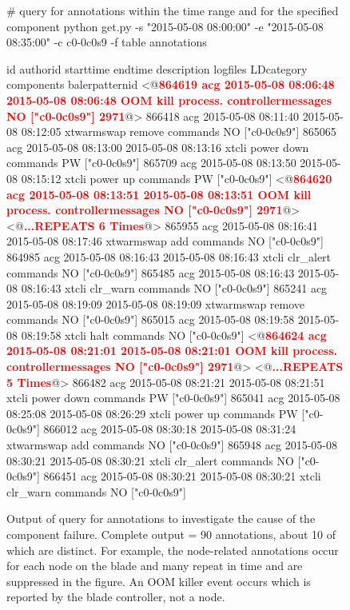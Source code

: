 \begin{figure*}
\begin{annol}
# query for annotations within the time range and for the specified component
python get.py -s "2015-05-08 08:00:00" -e "2015-05-08 08:35:00" -c c0-0c0s9 -f table annotations

id	authorid	starttime	endtime	description	logfiles	LDcategory	components	balerpatternid
<@\textbf{\textcolor{red}{864619	acg	2015-05-08 08:06:48	2015-05-08 08:06:48	OOM kill process.		controllermessages	NO	["c0-0c0s9"]	2971}}@>
866418	acg	2015-05-08 08:11:40	2015-05-08 08:12:05	xtwarmswap remove	commands	NO	["c0-0c0s9"]
865065	acg	2015-05-08 08:13:00	2015-05-08 08:13:16	xtcli power down	commands	PW	["c0-0c0s9"]
865709	acg	2015-05-08 08:13:50	2015-05-08 08:15:12	xtcli power up	commands	PW	["c0-0c0s9"]
<@\textbf{\textcolor{red}{864620	acg	2015-05-08 08:13:51     2015-05-08 08:13:51	OOM kill process.		controllermessages	NO	["c0-0c0s9"]	2971}}@>
<@\textbf{\textcolor{red}{...REPEATS 6 Times}}@>
865955	acg	2015-05-08 08:16:41	2015-05-08 08:17:46	xtwarmswap add	commands	NO	["c0-0c0s9"]
864985	acg	2015-05-08 08:16:43	2015-05-08 08:16:43	xtcli clr_alert	commands	NO	["c0-0c0s9"]
865485	acg	2015-05-08 08:16:43	2015-05-08 08:16:43	xtcli clr_warn	commands	NO	["c0-0c0s9"]
865241	acg	2015-05-08 08:19:09	2015-05-08 08:19:09	xtwarmswap remove	commands	NO	["c0-0c0s9"]
865015	acg	2015-05-08 08:19:58	2015-05-08 08:19:58	xtcli halt	commands	NO	["c0-0c0s9"]
<@\textbf{\textcolor{red}{864624	acg	2015-05-08 08:21:01	2015-05-08 08:21:01	OOM kill process.	controllermessages	NO	["c0-0c0s9"]	2971}}@>
<@\textbf{\textcolor{red}{...REPEATS 5 Times}}@>
866482	acg	2015-05-08 08:21:21	2015-05-08 08:21:51	xtcli power down	commands	PW	["c0-0c0s9"]
865041	acg	2015-05-08 08:25:08	2015-05-08 08:26:29	xtcli power up	commands	PW	["c0-0c0s9"]
866012	acg	2015-05-08 08:30:18	2015-05-08 08:31:24	xtwarmswap add	commands	NO	["c0-0c0s9"]
865948	acg	2015-05-08 08:30:21	2015-05-08 08:30:21	xtcli clr_alert	commands	NO	["c0-0c0s9"]
866451	acg	2015-05-08 08:30:21	2015-05-08 08:30:21	xtcli clr_warn	commands	NO	["c0-0c0s9"]
\end{annol}
\caption{Output of query for annotations to investigate the cause of the component failure. Complete output = 90 annotations, about 10 of which are distinct. For example, the
node-related annotations occur for each node on the blade and many repeat in time and are suppressed in the figure. An OOM killer event occurs which is reported by the blade
controller, not a node.}
\label{f:c0-0c0s9q}
\end{figure*}


